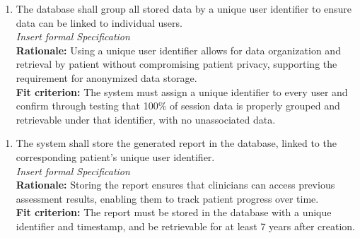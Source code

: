 \documentclass[12pt]{article}
\begin{document}
\begin{enumerate}[{FR-DSC}4. ]
  \item The database shall group all stored data by a unique user identifier to ensure data can be linked to 
  individual users.\\
  \textit{Insert formal Specification}\\
  \textbf{Rationale: }Using a unique user identifier allows for data organization and retrieval by patient without 
  compromising patient privacy, supporting the requirement for anonymized data storage.\\
  \textbf{Fit criterion: }The system must assign a unique identifier to every user and confirm through testing 
  that 100\% of session data is properly grouped and retrievable under that identifier, with no unassociated 
  data.
\end{enumerate}
\begin{enumerate}[{FR-DSC}5. ]
  \item The system shall store the generated report in the database, linked to the corresponding patient’s unique user identifier.\\
  \textit{Insert formal Specification}\\
  \textbf{Rationale: }Storing the report ensures that clinicians can access previous assessment results, enabling them to track patient progress over time.\\
  \textbf{Fit criterion: }The report must be stored in the database with a unique identifier and timestamp, and be retrievable for at least 7 years after creation.
\end{enumerate}
\end{document}
